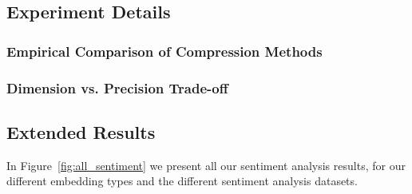 \subsection{Experiment Details}
\label{app:experiment_details}
\subsubsection{Empirical Comparison of Compression Methods}

\subsubsection{Dimension vs. Precision Trade-off}

\subsection{Extended Results}
\label{app:experiment_results}
In Figure~\ref{fig:all_sentiment} we present all our sentiment analysis results, for our different embedding types and the different sentiment analysis datasets.
